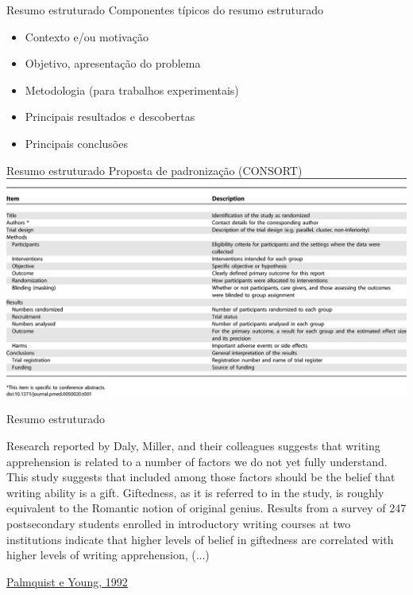 \documentclass{beamer}
\begin{document}
\begin{frame}{Resumo estruturado}
  Componentes típicos do resumo estruturado
  \begin{itemize}
  \item Contexto e/ou motivação
  \item Objetivo, apresentação do problema
  \item Metodologia (para trabalhos experimentais)
  \item Principais resultados e descobertas
  \item Principais conclusões
  \end{itemize}
\end{frame}

\begin{frame}{Resumo estruturado}
  Proposta de padronização (CONSORT)
  \includegraphics[height=0.8\textheight]{Revisao_resumo/resumo_estruturado}
\end{frame}

\begin{frame}{Resumo estruturado}
  \begin{example}
    Research reported by Daly, Miller, and their colleagues suggests
    that writing apprehension is related to a number of factors we do
    not yet fully understand. This study suggests that included among
    those factors should be the belief that writing ability is a
    gift. Giftedness, as it is referred to in the study, is roughly
    equivalent to the Romantic notion of original genius. Results from
    a survey of 247 postsecondary students enrolled in introductory
    writing courses at two institutions indicate that higher levels of
    belief in giftedness are correlated with higher levels of writing
    apprehension, (...) 
  \end{example}

  \vfill
  \scriptsize
  \hfill \href{https://doi.org/10.1177/0741088392009001004}{Palmquist e Young, 1992}
\end{frame}
\end{document}
